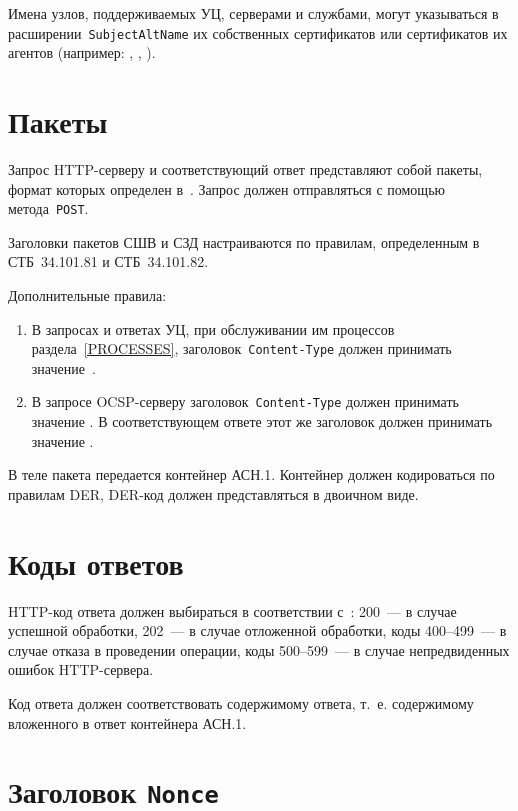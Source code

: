 Имена узлов, поддерживаемых УЦ, серверами и службами, могут указываться в 
расширении~\texttt{SubjectAltName} их собственных сертификатов или 
сертификатов их агентов
(например: , 
, 
).

\section{Пакеты}\label{TRANSPORT.Packets}

Запрос HTTP-серверу и соответствующий ответ представляют собой пакеты,
формат которых определен в~\cite{HTTP}.
%
Запрос должен отправляться с помощью метода~\texttt{POST}.

Заголовки пакетов СШВ и СЗД настраиваются по правилам, 
определенным в СТБ~34.101.81 и СТБ~34.101.82. 

Дополнительные правила:
\begin{enumerate}
\item
В запросах и ответах УЦ, при обслуживании им процессов раздела~\ref{PROCESSES},
заголовок~\texttt{Content-Type} должен принимать значение~.

\item
В запросе OCSP-серверу заголовок~\texttt{Content-Type} 
должен принимать значение .
В соответствующем ответе этот же заголовок должен принимать значение 
. 
\end{enumerate}

В теле пакета передается контейнер АСН.1.
Контейнер должен кодироваться по правилам DER, DER-код должен 
представляться в двоичном виде.

\section{Коды ответов}\label{TRANSPORT.Codes}

HTTP-код ответа должен выбираться в соответствии с~\cite{HTTP}: 
200~--- в случае успешной обработки, 
202~--- в случае отложенной обработки,
коды 400--499~--- в случае отказа в проведении операции,
коды 500--599~--- в случае непредвиденных ошибок HTTP-сервера.

Код ответа должен соответствовать содержимому ответа, т.~е.
содержимому вложенного в ответ контейнера АСН.1.

\section{Заголовок \texttt{Nonce}}\label{TRANSPORT.Nonce}

